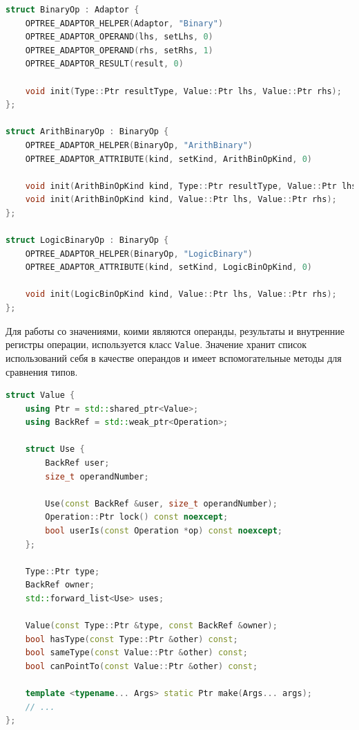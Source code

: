 \begin{lstlisting}[language=C++, caption=Объявление адаптеров для бинарных операций]
struct BinaryOp : Adaptor {
    OPTREE_ADAPTOR_HELPER(Adaptor, "Binary")
    OPTREE_ADAPTOR_OPERAND(lhs, setLhs, 0)
    OPTREE_ADAPTOR_OPERAND(rhs, setRhs, 1)
    OPTREE_ADAPTOR_RESULT(result, 0)

    void init(Type::Ptr resultType, Value::Ptr lhs, Value::Ptr rhs);
};

struct ArithBinaryOp : BinaryOp {
    OPTREE_ADAPTOR_HELPER(BinaryOp, "ArithBinary")
    OPTREE_ADAPTOR_ATTRIBUTE(kind, setKind, ArithBinOpKind, 0)

    void init(ArithBinOpKind kind, Type::Ptr resultType, Value::Ptr lhs, Value::Ptr rhs);
    void init(ArithBinOpKind kind, Value::Ptr lhs, Value::Ptr rhs);
};

struct LogicBinaryOp : BinaryOp {
    OPTREE_ADAPTOR_HELPER(BinaryOp, "LogicBinary")
    OPTREE_ADAPTOR_ATTRIBUTE(kind, setKind, LogicBinOpKind, 0)

    void init(LogicBinOpKind kind, Value::Ptr lhs, Value::Ptr rhs);
};
\end{lstlisting}

Для работы со значениями, коими являются операнды, результаты и внутренние регистры операции, используется класс \verb|Value|.
Значение хранит список использований себя в качестве операндов и имеет вспомогательные методы для сравнения типов.

\begin{lstlisting}[language=C++, caption=Объявление класса значения]
struct Value {
    using Ptr = std::shared_ptr<Value>;
    using BackRef = std::weak_ptr<Operation>;

    struct Use {
        BackRef user;
        size_t operandNumber;

        Use(const BackRef &user, size_t operandNumber);
        Operation::Ptr lock() const noexcept;
        bool userIs(const Operation *op) const noexcept;
    };

    Type::Ptr type;
    BackRef owner;
    std::forward_list<Use> uses;

    Value(const Type::Ptr &type, const BackRef &owner);
    bool hasType(const Type::Ptr &other) const;
    bool sameType(const Value::Ptr &other) const;
    bool canPointTo(const Value::Ptr &other) const;

    template <typename... Args> static Ptr make(Args... args);
    // ...
};
\end{lstlisting}

